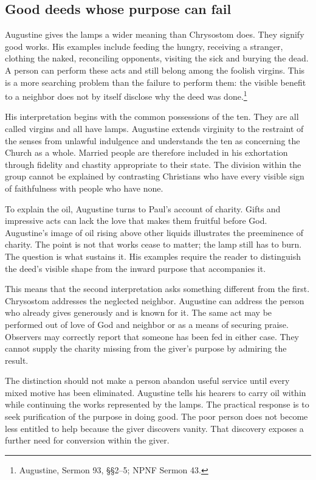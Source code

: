 \subsection{Good deeds whose purpose can fail}
Augustine gives the lamps a wider meaning than Chrysostom does. They signify good works. His examples include feeding the hungry, receiving a stranger, clothing the naked, reconciling opponents, visiting the sick and burying the dead. A person can perform these acts and still belong among the foolish virgins. This is a more searching problem than the failure to perform them: the visible benefit to a neighbor does not by itself disclose why the deed was done.\footnote{Augustine, Sermon 93, §§2--5; NPNF Sermon 43.}

His interpretation begins with the common possessions of the ten. They are all called virgins and all have lamps. Augustine extends virginity to the restraint of the senses from unlawful indulgence and understands the ten as concerning the Church as a whole. Married people are therefore included in his exhortation through fidelity and chastity appropriate to their state. The division within the group cannot be explained by contrasting Christians who have every visible sign of faithfulness with people who have none.

To explain the oil, Augustine turns to Paul's account of charity. Gifts and impressive acts can lack the love that makes them fruitful before God. Augustine's image of oil rising above other liquids illustrates the preeminence of charity. The point is not that works cease to matter; the lamp still has to burn. The question is what sustains it. His examples require the reader to distinguish the deed's visible shape from the inward purpose that accompanies it.

This means that the second interpretation asks something different from the first. Chrysostom addresses the neglected neighbor. Augustine can address the person who already gives generously and is known for it. The same act may be performed out of love of God and neighbor or as a means of securing praise. Observers may correctly report that someone has been fed in either case. They cannot supply the charity missing from the giver's purpose by admiring the result.

The distinction should not make a person abandon useful service until every mixed motive has been eliminated. Augustine tells his hearers to carry oil within while continuing the works represented by the lamps. The practical response is to seek purification of the purpose in doing good. The poor person does not become less entitled to help because the giver discovers vanity. That discovery exposes a further need for conversion within the giver.

